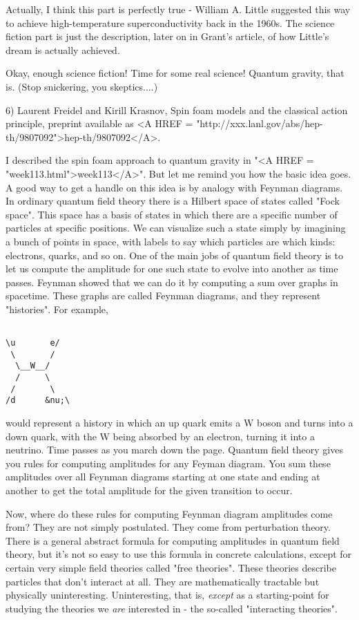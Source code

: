 Actually, I think this part is perfectly true - William A. Little
suggested this way to achieve high-temperature superconductivity back in
the 1960s.  The science fiction part is just the description, later on
in Grant's article, of how Little's dream is actually achieved.

Okay, enough science fiction!  Time for some real science!  Quantum
gravity, that is.  (Stop snickering, you skeptics....)

6) Laurent Freidel and Kirill Krasnov, Spin foam models and the 
classical action principle, preprint available as <A HREF = "http://xxx.lanl.gov/abs/hep-th/9807092">hep-th/9807092</A>.

I described the spin foam approach to quantum gravity in "<A HREF = "week113.html">week113</A>".  But
let me remind you how the basic idea goes.  A good way to get a handle
on this idea is by analogy with Feynman diagrams.  In ordinary quantum
field theory there is a Hilbert space of states called "Fock space".
This space has a basis of states in which there are a specific number of
particles at specific positions.  We can visualize such a state simply
by imagining a bunch of points in space, with labels to say which
particles are which kinds: electrons, quarks, and so on.  One of the
main jobs of quantum field theory is to let us compute the amplitude for
one such state to evolve into another as time passes.  Feynman showed
that we can do it by computing a sum over graphs in spacetime.  These
graphs are called Feynman diagrams, and they represent "histories".  For example,

\begin{verbatim}

\u       e/
 \       /
  \__W__/
  /     \
 /       \
/d      &nu;\
\end{verbatim}
    
would represent a history in which an up quark emits a W boson and turns
into a down quark, with the W being absorbed by an electron, turning it
into a neutrino.  Time passes as you march down the page.  Quantum field
theory gives you rules for computing amplitudes for any Feyman diagram.
You sum these amplitudes over all Feynman diagrams starting at one state
and ending at another to get the total amplitude for the given transition
to occur.

Now, where do these rules for computing Feynman diagram amplitudes
come from?  They are not simply postulated.  They come from perturbation
theory.  There is a general abstract formula for computing amplitudes in
quantum field theory, but it's not so easy to use this formula in
concrete calculations, except for certain very simple field theories
called "free theories".  These theories describe particles
that don't interact at all.  They are mathematically tractable but
physically uninteresting.  Uninteresting, that is, \emph{except} as a
starting-point for studying the theories we \emph{are} interested in -
the so-called "interacting theories".

